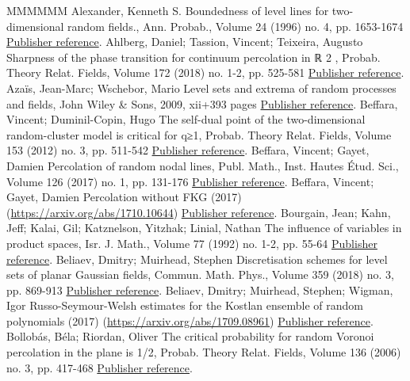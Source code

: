 \documentclass[11pt]{article}
\theoremstyle{definition}
\numberwithin{equation}{section}
\begin{document}
\begin{thebibliography}{MMMMMM}
 Alexander, Kenneth S. Boundedness of level lines for two-dimensional random fields., Ann. Probab., Volume 24 (1996) no. 4, pp. 1653-1674 \href{https://ahl.centre-mersenne.org/item/AHL_2020__3__169_0/#alex_96}{Publisher reference}.
 Ahlberg, Daniel; Tassion, Vincent; Teixeira, Augusto Sharpness of the phase transition for continuum percolation in ℝ 2 , Probab. Theory Relat. Fields, Volume 172 (2018) no. 1-2, pp. 525-581 \href{https://ahl.centre-mersenne.org/item/AHL_2020__3__169_0/#ahlberg2016sharpness}{Publisher reference}.
 Azaïs, Jean-Marc; Wschebor, Mario Level sets and extrema of random processes and fields, John Wiley \& Sons, 2009, xii+393 pages \href{https://ahl.centre-mersenne.org/item/AHL_2020__3__169_0/#azws}{Publisher reference}.
 Beffara, Vincent; Duminil-Copin, Hugo The self-dual point of the two-dimensional random-cluster model is critical for q≥1, Probab. Theory Relat. Fields, Volume 153 (2012) no. 3, pp. 511-542 \href{https://ahl.centre-mersenne.org/item/AHL_2020__3__169_0/#beffara2012self}{Publisher reference}.
 Beffara, Vincent; Gayet, Damien Percolation of random nodal lines, Publ. Math., Inst. Hautes Étud. Sci., Volume 126 (2017) no. 1, pp. 131-176 \href{https://ahl.centre-mersenne.org/item/AHL_2020__3__169_0/#bg_16}{Publisher reference}.
 Beffara, Vincent; Gayet, Damien Percolation without FKG (2017) (\url{https://arxiv.org/abs/1710.10644}) \href{https://ahl.centre-mersenne.org/item/AHL_2020__3__169_0/#bg_17}{Publisher reference}.
 Bourgain, Jean; Kahn, Jeff; Kalai, Gil; Katznelson, Yitzhak; Linial, Nathan The influence of variables in product spaces, Isr. J. Math., Volume 77 (1992) no. 1-2, pp. 55-64 \href{https://ahl.centre-mersenne.org/item/AHL_2020__3__169_0/#bourgain1992influence}{Publisher reference}.
 Beliaev, Dmitry; Muirhead, Stephen Discretisation schemes for level sets of planar Gaussian fields, Commun. Math. Phys., Volume 359 (2018) no. 3, pp. 869-913 \href{https://ahl.centre-mersenne.org/item/AHL_2020__3__169_0/#bm_17}{Publisher reference}.
 Beliaev, Dmitry; Muirhead, Stephen; Wigman, Igor Russo-Seymour-Welsh estimates for the Kostlan ensemble of random polynomials (2017) (\url{https://arxiv.org/abs/1709.08961}) \href{https://ahl.centre-mersenne.org/item/AHL_2020__3__169_0/#bmw_17}{Publisher reference}.
 Bollobás, Béla; Riordan, Oliver The critical probability for random Voronoi percolation in the plane is 1/2, Probab. Theory Relat. Fields, Volume 136 (2006) no. 3, pp. 417-468 \href{https://ahl.centre-mersenne.org/item/AHL_2020__3__169_0/#bollobas2006critical}{Publisher reference}.

\end{thebibliography}
\end{document}
